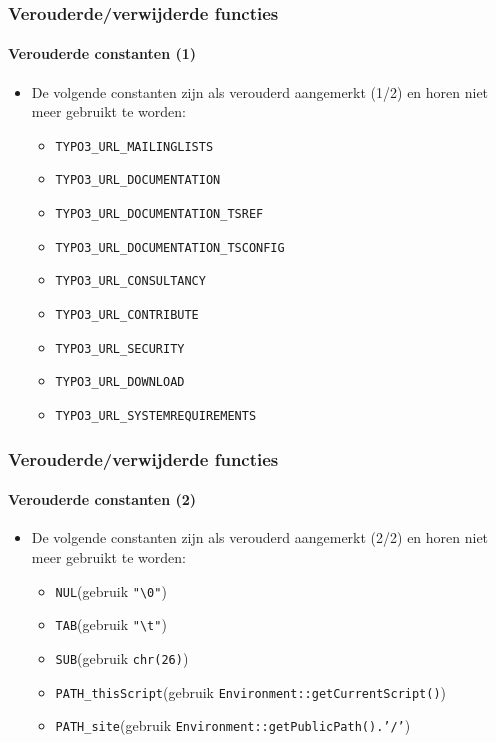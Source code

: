 \begin{frame}[fragile]
	\frametitle{Verouderde/verwijderde functies}
	\framesubtitle{Verouderde constanten (1)}

	\begin{itemize}
		\item De volgende constanten zijn als verouderd aangemerkt (1/2)\newline
			en horen niet meer gebruikt te worden:

			\begin{itemize}\smaller
				\item \texttt{TYPO3\_URL\_MAILINGLISTS}
				\item \texttt{TYPO3\_URL\_DOCUMENTATION}
				\item \texttt{TYPO3\_URL\_DOCUMENTATION\_TSREF}
				\item \texttt{TYPO3\_URL\_DOCUMENTATION\_TSCONFIG}
				\item \texttt{TYPO3\_URL\_CONSULTANCY}
				\item \texttt{TYPO3\_URL\_CONTRIBUTE}
				\item \texttt{TYPO3\_URL\_SECURITY}
				\item \texttt{TYPO3\_URL\_DOWNLOAD}
				\item \texttt{TYPO3\_URL\_SYSTEMREQUIREMENTS}
			\end{itemize}

	\end{itemize}

\end{frame}


\begin{frame}[fragile]
	\frametitle{Verouderde/verwijderde functies}
	\framesubtitle{Verouderde constanten (2)}

	\begin{itemize}
		\item De volgende constanten zijn als verouderd aangemerkt (2/2)\newline
			en horen niet meer gebruikt te worden:

			\begin{itemize}\smaller
				\item \texttt{NUL}\tabto{3cm}(gebruik \texttt{"\textbackslash 0"})
				\item \texttt{TAB}\tabto{3cm}(gebruik \texttt{"\textbackslash t"})
				\item \texttt{SUB}\tabto{3cm}(gebruik \texttt{chr(26)})
				\item \texttt{PATH\_thisScript}\tabto{3cm}(gebruik \texttt{Environment::getCurrentScript()})
				\item \texttt{PATH\_site}\tabto{3cm}(gebruik \texttt{Environment::getPublicPath().'/'})
			\end{itemize}
	\end{itemize}

\end{frame}


